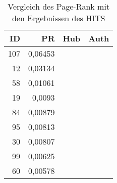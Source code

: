 

\begin{frame}[c]
\begin{table}
\begin{tabular}{r|r|r|r}
\textbf{ID} & \textbf{PR} & \textbf{Hub} & \textbf{Auth}\\
\hline
107 & 0,06453 & & \\
12 & 0,03134 & & \\
58 & 0,01061 & & \\
19 & 0,0093 & & \\
84 & 0,00879 & & \\
95 & 0,00813 & & \\
30 & 0,00807 & & \\
99 & 0,00625 & & \\
60 & 0,00578 & & \\
\end{tabular}
\caption{Vergleich des Page-Rank mit den Ergebnissen des HITS}
\label{tbl:pr_vs_hits}
\end{table}

\end{frame}